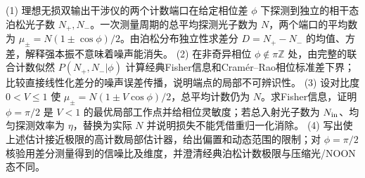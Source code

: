 (1) 理想无损双输出干涉仪的两个计数端口在给定相位差 \(\phi\) 下探测到独立的相干态泊松光子数 \(N_+,N_-\)。一次测量周期的总平均探测光子数为 \(N\)，两个端口的平均数为 \(\mu_\pm=N(1\pm\cos\phi)/2\)。由泊松分布独立性求差分 \(D=N_+-N_-\) 的均值、方差，解释强本振不意味着噪声能消失。
(2) 在非奇异相位 \(\phi\notin\pi\mathbb Z\) 处，由完整的联合计数似然 \(P(N_+,N_-|\phi)\) 计算经典Fisher信息和Cramér--Rao相位标准差下界；比较直接线性化差分的噪声误差传播，说明端点的局部不可辨识性。
(3) 设对比度 \(0<V\le1\) 使 \(\mu_\pm=N(1\pm V\cos\phi)/2\)，总平均计数仍为 \(N\)。求Fisher信息，证明 \(\phi=\pi/2\) 是 \(V<1\) 的最优局部工作点并给相位灵敏度；若总入射光子数为 \(N_{\rm in}\)、均匀探测效率为 \(\eta\)，替换为实际 \(N\) 并说明损失不能凭借重归一化消除。
(4) 写出使上述估计接近极限的高计数局部估计器，给出偏置和动态范围的限制；对 \(\phi=\pi/2\) 核验用差分测量得到的信噪比及维度，并澄清经典泊松计数极限与压缩光/NOON态不同。
